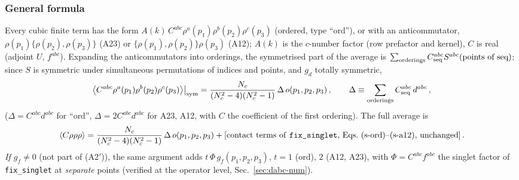 \documentclass[10pt]{article}
\begin{document}
\subsubsection{General formula}
\noindent Every cubic finite term has the form $A(k)\,C^{abc}\rho^{a}(p_{1})\rho^{b}(p_{2})\rho^{c}(p_{3})$ (ordered, type ``ord''), or with an anticommutator, $\rho(p_{1})\{\rho(p_{2}),\rho(p_{3})\}$ (A23) or $\{\rho(p_{1}),\rho(p_{2})\}\rho(p_{3})$ (A12); $A(k)$ is the $c$-number factor (row prefactor and kernel), $C$ is real (adjoint $U$, $f^{abc}$). Expanding the anticommutators into orderings, the symmetrised part of the average is $\sum_{\rm orderings}C^{abc}_{\rm seq}S^{abc}(\text{points of seq})$; since $S$ is symmetric under simultaneous permutations of indices and points, and $g_{d}$ totally symmetric,
\begin{align}
\big\langle C^{abc}\rho^{a}(p_{1})\rho^{b}(p_{2})\rho^{c}(p_{3})\big\rangle\big|_{\rm sym}=\frac{N_{c}}{(N_{c}^{2}-4)(N_{c}^{2}-1)}\,\Delta\,o(p_{1},p_{2},p_{3})\,,\qquad\Delta\equiv\sum_{\rm orderings}C^{abc}_{\rm seq}\,d^{abc}\,,\label{eq:dabc-gen}
\end{align}
($\Delta=C^{abc}d^{abc}$ for ``ord'', $\Delta=2C^{abc}d^{abc}$ for A23, A12, with $C$ the coefficient of the first ordering). The full average is
\begin{align}
\langle C\rho\rho\rho\rangle=\frac{N_{c}}{(N_{c}^{2}-4)(N_{c}^{2}-1)}\,\Delta\,o(p_{1},p_{2},p_{3})+[\text{contact terms of \texttt{fix\_singlet}, Eqs.~(s-ord)--(s-a12), unchanged}]\,.\notag
\end{align}
\emph{If $g_{f}\neq0$} (not part of (A2$'$)), the same argument adds $t\,\Phi\,g_{f}(p_{1},p_{2},p_{3})$, $t=1$ (ord), $2$ (A12, A23), with $\Phi=C^{abc}f^{abc}$ the singlet factor of \texttt{fix\_singlet} at \emph{separate} points (verified at the operator level, Sec.~\ref{sec:dabc-num}).
\end{document}

